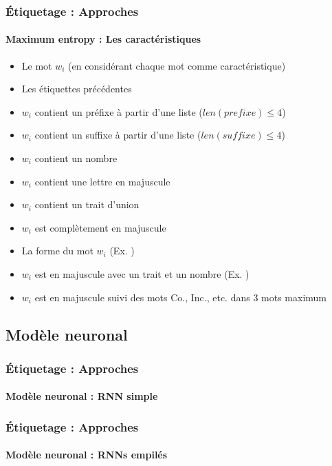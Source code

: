 \documentclass[xcolor=table]{beamer}
\begin{document}
\begin{frame}
\frametitle{Étiquetage : Approches}
\framesubtitle{Maximum entropy : Les caractéristiques}

\begin{itemize}
	\item Le mot $w_i$ (en considérant chaque mot comme caractéristique)
	\item Les étiquettes précédentes 
	\item $w_i$ contient un préfixe à partir d'une liste ($len(prefixe) \le 4$) 
	\item $w_i$ contient un suffixe à partir d'une liste ($len(suffixe) \le 4$) 
	\item $w_i$ contient un nombre 
	\item $w_i$ contient une lettre en majuscule
	\item $w_i$ contient un trait d'union 
	\item $w_i$ est complètement en majuscule
	\item La forme du mot $w_i$ (Ex. ) 
	\item $w_i$ est en majuscule avec un trait et un nombre (Ex. ) 
	\item $w_i$ est en majuscule suivi des mots Co., Inc., etc. dans 3 mots maximum
\end{itemize}

\end{frame}

\subsection{Modèle neuronal}

\begin{frame}
\frametitle{Étiquetage : Approches}
\framesubtitle{Modèle neuronal : RNN simple}


\end{frame}

\begin{frame}
\frametitle{Étiquetage : Approches}
\framesubtitle{Modèle neuronal : RNNs empilés}



\end{frame}
\end{document}
